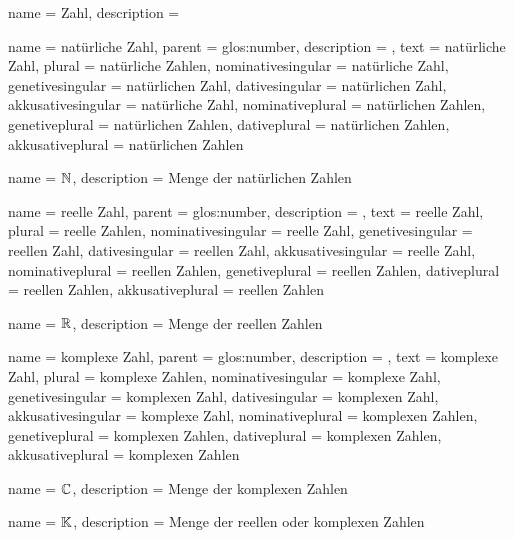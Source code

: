 {
    name = {Zahl},
    description = {}
}

{
    name               = {natürliche Zahl},
    parent             = {glos:number},
    description        = {},
    text               = {natürliche Zahl},
    plural             = {natürliche Zahlen},
    nominativesingular = {natürliche Zahl},
    genetivesingular   = {natürlichen Zahl},
    dativesingular     = {natürlichen Zahl},
    akkusativesingular = {natürliche Zahl},
    nominativeplural   = {natürlichen Zahlen},
    genetiveplural     = {natürlichen Zahlen},
    dativeplural       = {natürlichen Zahlen},
    akkusativeplural   = {natürlichen Zahlen}
}

{
    name        = $\mathbb N$,
    description = {Menge der natürlichen Zahlen}
}

{
    name               = {reelle Zahl},
    parent             = {glos:number},
    description        = {},
    text               = {reelle Zahl},
    plural             = {reelle Zahlen},
    nominativesingular = {reelle Zahl},
    genetivesingular   = {reellen Zahl},
    dativesingular     = {reellen Zahl},
    akkusativesingular = {reelle Zahl},
    nominativeplural   = {reellen Zahlen},
    genetiveplural     = {reellen Zahlen},
    dativeplural       = {reellen Zahlen},
    akkusativeplural   = {reellen Zahlen}
}

{
    name        = $\mathbb R$,
    description = {Menge der reellen Zahlen}
}

{
    name               = {komplexe Zahl},
    parent             = {glos:number},
    description        = {},
    text               = {komplexe Zahl},
    plural             = {komplexe Zahlen},
    nominativesingular = {komplexe Zahl},
    genetivesingular   = {komplexen Zahl},
    dativesingular     = {komplexen Zahl},
    akkusativesingular = {komplexe Zahl},
    nominativeplural   = {komplexen Zahlen},
    genetiveplural     = {komplexen Zahlen},
    dativeplural       = {komplexen Zahlen},
    akkusativeplural   = {komplexen Zahlen}
}

{
    name        = $\mathbb C$,
    description = {Menge der komplexen Zahlen}
}

{
    name        = $\mathbb K$,
    description = {Menge der reellen oder komplexen Zahlen}
}

